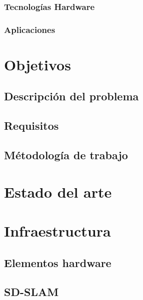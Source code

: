 \documentclass[a4paper, 12pt]{book}
\begin{document}
\subsection{Tecnologías Hardware}
\label{subsec:tecnohardware}

\subsection{Aplicaciones}
\label{subsec:raaplicaciones}

\chapter{Objetivos}
\label{sec:objetivos}

\section{Descripción del problema}
\label{subsec:descripcionproblema}

\section{Requisitos}
\label{subsec:requisitos}

\section{Métodología de trabajo}
\label{subsec:metodologiadetrabajo}

\chapter{Estado del arte} %
\label{sec:estadodelarte}

\chapter{Infraestructura}
\label{sec:infraestructura}

\section{Elementos hardware}
\label{sec:elementoshardware}

\section{SD-SLAM}
\label{sec:sdslam}
\end{document}
